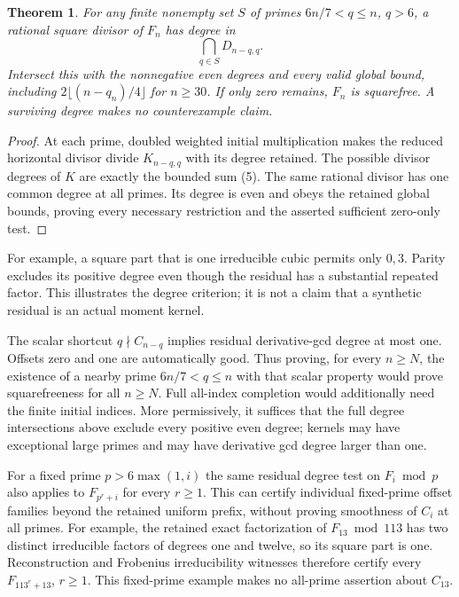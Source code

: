 \documentclass[11pt]{article}
\newtheorem{theorem}{Theorem}
\begin{document}
\begin{theorem}\label{thm:degrees}
For any finite nonempty set $S$ of primes $6n/7<q\le n$, $q>6$,
a rational square divisor of $F_n$ has degree in
\[
 \bigcap_{q\in S}D_{n-q,q}.
\]
Intersect this with the nonnegative even degrees and every valid global
bound, including $2\lfloor(n-q_n)/4\rfloor$ for $n\ge30$.
If only zero remains, $F_n$ is squarefree. A surviving degree makes
no counterexample claim.
\end{theorem}
\begin{proof}
At each prime, doubled weighted initial multiplication makes the
reduced horizontal divisor divide $K_{n-q,q}$ with its degree retained.
The possible divisor degrees of $K$ are exactly the bounded sum (5).
The same rational divisor has one common degree at all primes.
Its degree is even and obeys the retained global bounds, proving every
necessary restriction and the asserted sufficient zero-only test.
\end{proof}
For example, a square part that is one irreducible cubic permits only
$0,3$. Parity excludes its positive degree even though the residual
has a substantial repeated factor. This illustrates the degree criterion;
it is not a claim that a synthetic residual is an actual moment kernel.

The scalar shortcut $q\nmid C_{n-q}$ implies residual derivative-gcd
degree at most one. Offsets zero and one are automatically good.
Thus proving, for every $n\ge N$, the existence of a nearby prime
$6n/7<q\le n$ with that scalar property would prove squarefreeness
for all $n\ge N$. Full all-index completion would additionally need
the finite initial indices. More permissively, it suffices that the full
degree intersections above exclude every positive even degree; kernels
may have exceptional large primes and may have derivative gcd degree
larger than one.

For a fixed prime $p>6\max(1,i)$ the same residual degree test on
$F_i\bmod p$ also applies to $F_{p^r+i}$ for every $r\ge1$.
This can certify individual fixed-prime offset families beyond the
retained uniform prefix, without proving smoothness of $C_i$ at all primes.
For example, the retained exact factorization of $F_{13}\bmod113$ has
two distinct irreducible factors of degrees one and twelve, so its square
part is one. Reconstruction and Frobenius irreducibility witnesses
therefore certify every $F_{113^r+13}$, $r\ge1$. This fixed-prime
example makes no all-prime assertion about $C_{13}$.
\end{document}
